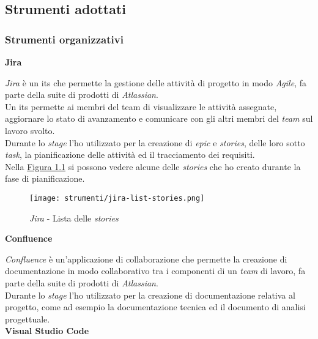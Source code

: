 \pagebreak

\subsection{Strumenti adottati}
\label{sez:strumenti-adottati}

\subsubsection{Strumenti organizzativi}
\label{sez:strumenti-organizzativi}

\noindent \textbf{Jira\\}

\noindent \textit{Jira} è un \gls{its} che permette la gestione delle attività di progetto in modo \textit{Agile}, fa parte della suite di prodotti di \textit{Atlassian}.\\
Un \gls{its} permette ai membri del team di visualizzare le attività assegnate, aggiornare lo stato di avanzamento e comunicare con gli altri membri del \textit{team} sul lavoro svolto. \\
Durante lo \textit{stage} l'ho utilizzato per la creazione di \textit{epic} e \textit{stories}, delle loro sotto \textit{task}, la pianificazione delle attività ed il tracciamento dei requisiti. \\
Nella {\hyperref[fig:jira-list-stories]{Figura 1.1}} si possono vedere alcune delle \textit{stories} che ho creato durante la fase di pianificazione.
\begin{figure}[H]
    \label{fig:jira-list-stories}
    \centering
    \texttt{[image: strumenti/jira-list-stories.png]}
    \caption{\textit{Jira} - Lista delle \textit{stories}}
\end{figure}

\noindent \textbf{Confluence\\}

\noindent \textit{Confluence} è un'applicazione di collaborazione che permette la creazione di documentazione in modo collaborativo tra i componenti di un \textit{team} di lavoro, fa parte della suite di prodotti di \textit{Atlassian}.\\
Durante lo \textit{stage} l'ho utilizzato per la creazione di documentazione relativa al progetto, come ad esempio la documentazione tecnica ed il documento di analisi progettuale.\\

\pagebreak
\noindent \textbf{Visual Studio Code\\}

